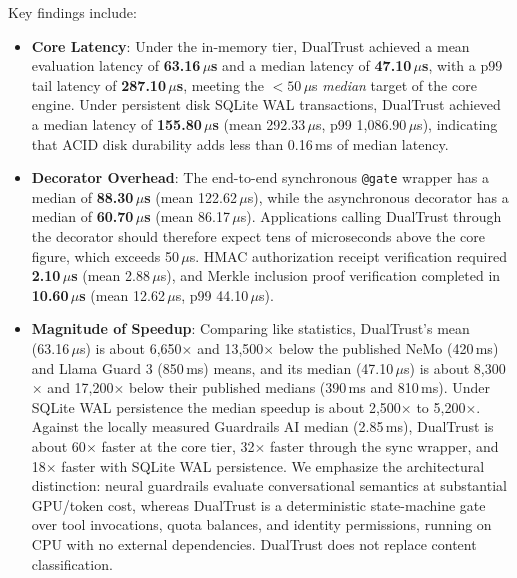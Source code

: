 \documentclass[journal]{IEEEtran}
\begin{document}
Key findings include:
\begin{itemize}[leftmargin=12pt, topsep=2pt, itemsep=1pt]
\item \textbf{Core Latency}: Under the in-memory tier, DualTrust achieved a mean evaluation latency of \textbf{63.16\,$\mu$s} and a median latency of \textbf{47.10\,$\mu$s}, with a p99 tail latency of \textbf{287.10\,$\mu$s}, meeting the $<50\,\mu$s \emph{median} target of the core engine. Under persistent disk SQLite WAL transactions, DualTrust achieved a median latency of \textbf{155.80\,$\mu$s} (mean 292.33\,$\mu$s, p99 1,086.90\,$\mu$s), indicating that ACID disk durability adds less than 0.16\,ms of median latency.
\item \textbf{Decorator Overhead}: The end-to-end synchronous \texttt{@gate} wrapper has a median of \textbf{88.30\,$\mu$s} (mean 122.62\,$\mu$s), while the asynchronous decorator has a median of \textbf{60.70\,$\mu$s} (mean 86.17\,$\mu$s). Applications calling DualTrust through the decorator should therefore expect tens of microseconds above the core figure, which exceeds 50\,$\mu$s. HMAC authorization receipt verification required \textbf{2.10\,$\mu$s} (mean 2.88\,$\mu$s), and Merkle inclusion proof verification completed in \textbf{10.60\,$\mu$s} (mean 12.62\,$\mu$s, p99 44.10\,$\mu$s).
\item \textbf{Magnitude of Speedup}: Comparing like statistics, DualTrust's mean (63.16\,$\mu$s) is about 6,650$\times$ and 13,500$\times$ below the published NeMo (420\,ms) and Llama Guard 3 (850\,ms) means, and its median (47.10\,$\mu$s) is about 8,300$\times$ and 17,200$\times$ below their published medians (390\,ms and 810\,ms). Under SQLite WAL persistence the median speedup is about 2,500$\times$ to 5,200$\times$. Against the locally measured Guardrails AI median (2.85\,ms), DualTrust is about 60$\times$ faster at the core tier, 32$\times$ faster through the sync wrapper, and 18$\times$ faster with SQLite WAL persistence. We emphasize the architectural distinction: neural guardrails evaluate conversational semantics at substantial GPU/token cost, whereas DualTrust is a deterministic state-machine gate over tool invocations, quota balances, and identity permissions, running on CPU with no external dependencies. DualTrust does not replace content classification.
\end{itemize}
\end{document}
